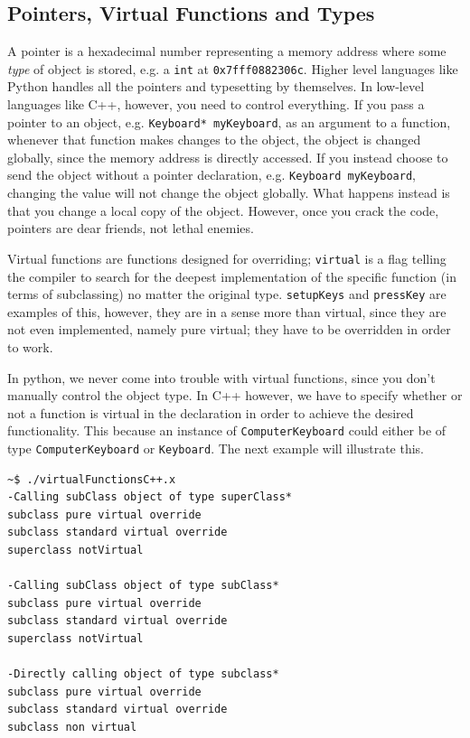\subsection{Pointers, Virtual Functions and Types}

A pointer is a hexadecimal number representing a memory address where some \textit{type} of object is stored, e.g. a \verb+int+ at \verb+0x7fff0882306c+. Higher level languages like Python handles all the pointers and typesetting by themselves. In low-level languages like C++, however, you need to control everything. If you pass a pointer to an object, e.g. \verb+Keyboard* myKeyboard+, as an argument to a function, whenever that function makes changes to the object, the object is changed globally, since the memory address is directly accessed. If you instead choose to send the object without a pointer declaration, e.g. \verb+Keyboard myKeyboard+, changing the value will not change the object globally. What happens instead is that you change a local copy of the object. However, once you crack the code, pointers are dear friends, not lethal enemies.

Virtual functions are functions designed for overriding; \verb+virtual+ is a flag telling the compiler to search for the deepest implementation of the specific function (in terms of subclassing) no matter the original type. \verb+setupKeys+ and \verb+pressKey+ are examples of this, however, they are in a sense more than virtual, since they are not even implemented, namely pure virtual; they have to be overridden in order to work. 

In python, we never come into trouble with virtual functions, since you don't manually control the object type. In C++ however, we have to specify whether or not a function is virtual in the declaration in order to achieve the desired functionality. This because an instance of \verb+ComputerKeyboard+ could either be of type \verb+ComputerKeyboard+ or \verb+Keyboard+. The next example will illustrate this. 

\vspace{0.5 cm}


\begin{verbatim}
~$ ./virtualFunctionsC++.x 
-Calling subClass object of type superClass*
subclass pure virtual override
subclass standard virtual override
superclass notVirtual

-Calling subClass object of type subClass*
subclass pure virtual override
subclass standard virtual override
superclass notVirtual

-Directly calling object of type subclass*
subclass pure virtual override
subclass standard virtual override
subclass non virtual
\end{verbatim}

